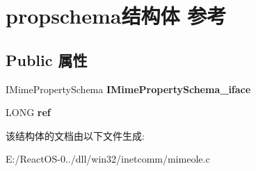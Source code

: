 \hypertarget{structpropschema}{}\section{propschema结构体 参考}
\label{structpropschema}
\subsection*{Public 属性}
\begin{DoxyCompactItemize}
\item 
\mbox{\label{structpropschema_a8d2e5de039329e6a67b4ac4bfbad347a}} 
I\+Mime\+Property\+Schema {\bfseries I\+Mime\+Property\+Schema\+\_\+iface}
\item 
\mbox{\label{structpropschema_a66adfb5fe59da5031af0f2221db81992}} 
L\+O\+NG {\bfseries ref}
\end{DoxyCompactItemize}


该结构体的文档由以下文件生成\+:\begin{DoxyCompactItemize}
\item 
E\+:/\+React\+O\+S-\/0../dll/win32/inetcomm/mimeole.\+c\end{DoxyCompactItemize}
